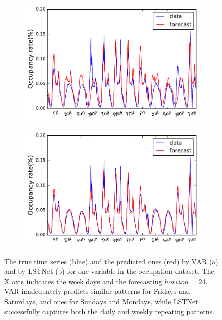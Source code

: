 \begin{figure}[!ht]
\begin{subfigure}{.45\textwidth}
  \centering
  \includegraphics[width=\linewidth]{fig/traffic-var.pdf}
  \caption{}
  \label{fig:tra-var}
\end{subfigure}
\begin{subfigure}{.45\textwidth}
  \centering
  \includegraphics[width=\linewidth]{fig/traffic-tnn.pdf}
  \caption{}
  \label{fig:tra-tnn}
\end{subfigure}

\caption{The true time series (blue) and the predicted ones (red) by VAR (a) and by LSTNet (b) for one variable in the \traffic occupation dataset. The X axis indicates the week days and the forecasting $horizon = 24$.  VAR inadequately predicts similar patterns for Fridays and Saturdays, and ones for Sundays and Mondays, while LSTNet successfully captures both the daily and weekly repeating patterns.}
\label{fig:traffic}
\end{figure}



